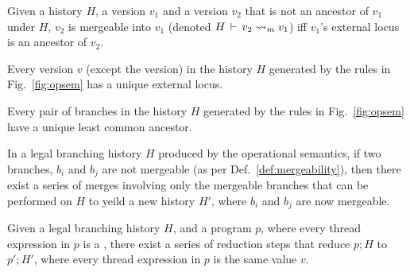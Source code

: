 \begin{definition} 
\label{def:mergeability}
Given a history $H$, a version $v_1$ and a version $v_2$ that is not
an ancestor of $v_1$ under $H$, $v_2$ is mergeable into $v_1$ (denoted
$H\,\vdash\,v_2 \rightsquigarrow_m v_1$) iff $v_1$'s external locus is an
ancestor of $v_2$.
\end{definition}

\begin{lemma} 
Every version $v$ (except the  version) in the history $H$
generated by the rules in Fig.~\ref{fig:opsem} has a unique external
locus.
\end{lemma}

\begin{lemma} 
Every pair of branches in the history $H$ generated by the rules in
Fig.~\ref{fig:opsem} have a unique least common ancestor. 
\end{lemma}

\begin{lemma} 
In a legal branching history $H$ produced by the operational
semantics, if two branches, $b_i$ and $b_j$ are not mergeable (as per
Def.~\ref{def:mergeability}), then there exist a series of merges
involving only the mergeable branches that can be performed on $H$ to
yeild a new history $H'$, where $b_i$ and $b_j$ are now mergeable.
\end{lemma}

\begin{theorem}  Given a
legal branching history $H$, and a program $p$, where every thread
expression in $p$ is a , there exist a series of reduction steps
that reduce $p; H$ to $p'; H'$, where every thread expression in $p$
is the same value $v$.
\end{theorem}


